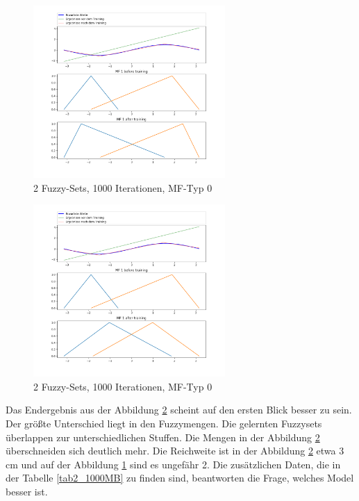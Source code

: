 {\begin{figure}[htbp]
	\centering
	\includegraphics[width=0.65\textwidth]{images/sinus/Mini-Batch/sinus 1 Input 2 Sets 5000 Epochs Mini-Batch Gradient Descent two equations mf.png}
	\caption{2 Fuzzy-Sets, 1000 Iterationen, MF-Typ 0} \label{2mini_batch1000:0}
\end{figure}
\begin{figure}[htbp]
	\centering
	\includegraphics[width=0.65\textwidth]{images/sinus/Mini-Batch/sinus 1 Input 2 Sets 5000 Epochs Mini-Batch Gradient Descent one equation mf.png}
	\caption{2 Fuzzy-Sets, 1000 Iterationen, MF-Typ 0} \label{2mini_batch1000:1}
\end{figure}

Das Endergebnis aus der Abbildung \ref{2mini_batch1000:1} scheint auf den ersten Blick besser zu sein. Der größte Unterschied liegt in den Fuzzymengen. Die gelernten Fuzzysets überlappen zur unterschiedlichen Stuffen. Die Mengen in der Abbildung \ref{2mini_batch1000:1} überschneiden sich deutlich mehr. Die Reichweite ist in der Abbildung \ref{2mini_batch1000:1} etwa 3 cm und auf der Abbildung \ref{2mini_batch1000:0} sind es ungefähr 2. Die zusätzlichen Daten, die in der Tabelle \ref{tab2_1000MB} zu finden sind, beantworten die Frage, welches Model besser ist.

}
